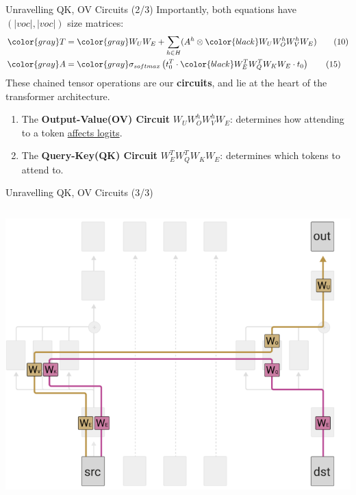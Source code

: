 \documentclass{beamer}
\begin{document}
\begin{frame}{Unravelling QK, OV Circuits (2/3)}
	Importantly, both equations have $(|voc|, |voc|)$ size matrices:
	\begin{align}
		\color{gray} T &= \color{gray} W_UW_E + \sum_{h \in H} (A^h \otimes {\color{black}W_UW_O^h W_V^hW_E}) \tag{10} \\
		\color{gray} A &= \color{gray} \sigma_{softmax}\left(t_0^T \cdot {\color{black}W_E^TW_Q^TW_KW_E} \cdot t_0 \right) \tag{15}
	\end{align}
	These chained tensor operations are our \textbf{circuits}, and lie at the heart of the transformer architecture. \pause
	\begin{enumerate}[label=\alph*.]
		\item The \textbf{Output-Value(OV) Circuit} $W_UW_O^h W_V^hW_E$: determines how attending to a token \underline{affects logits}. \pause
		\item The \textbf{Query-Key(QK) Circuit} $W_E^TW_Q^TW_KW_E$: determines which tokens to attend to.
	\end{enumerate} 
\end{frame}

\begin{frame}{Unravelling QK, OV Circuits (3/3)}
	\begin{columns}
		\begin{column}{.75\textwidth}
			\begin{center}
				\includegraphics[width=\textwidth]{img/circuit.png}
			\end{center}
		\end{column}
	\end{columns}
\end{frame}
\end{document}
